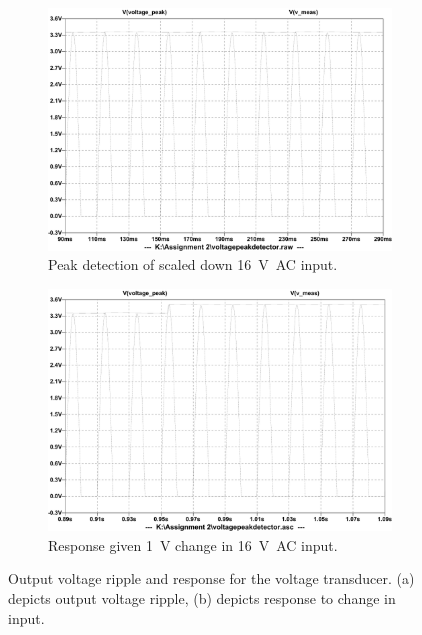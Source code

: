 \begin{figure}[h!]
 \centering
     \begin{subfigure}[]{0.45\textwidth}
        \centering
         \includegraphics[width=1\linewidth]{./Figures/voltagepeakdetectoroutputsim.pdf}
		    \caption{Peak detection of scaled down \SI{16}{\volt AC} input.} \label{subfig:16VACinputripple}
     \end{subfigure}
      \begin{subfigure}[]{0.45\textwidth}
              \centering
  		\includegraphics[width=1\linewidth]{./Figures/voltagepeakdetectoroutputchange.pdf}
		    \caption{Response given \SI{1}{\volt} change in \SI{16}{\volt AC} input.} \label{subfig:16VACinputchange}
     \end{subfigure}
   \caption[Simulated results for the voltage transducer]{Output voltage ripple and response for the voltage transducer. (a) depicts output voltage ripple, (b) depicts response to change in input. }
    \label{fig:simulation_results_box}
 \end{figure}

